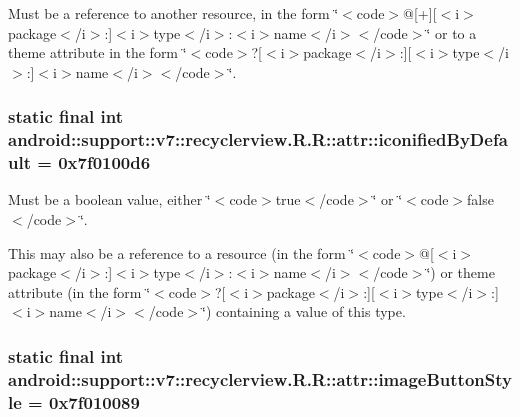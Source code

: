 Must be a reference to another resource, in the form \char`\"{}$<$code$>$@\mbox{[}+\mbox{]}\mbox{[}$<$i$>$package$<$/i$>$:\mbox{]}$<$i$>$type$<$/i$>$:$<$i$>$name$<$/i$>$$<$/code$>$\char`\"{} or to a theme attribute in the form \char`\"{}$<$code$>$?\mbox{[}$<$i$>$package$<$/i$>$:\mbox{]}\mbox{[}$<$i$>$type$<$/i$>$:\mbox{]}$<$i$>$name$<$/i$>$$<$/code$>$\char`\"{}. \hypertarget{classandroid_1_1support_1_1v7_1_1recyclerview_1_1_r_1_1attr_455008e854cc92bf685b28d87db05008}{
\subsubsection[{iconifiedByDefault}]{\setlength{\rightskip}{0pt plus 5cm}static final int android::support::v7::recyclerview.R.R::attr::iconifiedByDefault = 0x7f0100d6}}
\label{classandroid_1_1support_1_1v7_1_1recyclerview_1_1_r_1_1attr_455008e854cc92bf685b28d87db05008}


Must be a boolean value, either \char`\"{}$<$code$>$true$<$/code$>$\char`\"{} or \char`\"{}$<$code$>$false$<$/code$>$\char`\"{}. 

This may also be a reference to a resource (in the form \char`\"{}$<$code$>$@\mbox{[}$<$i$>$package$<$/i$>$:\mbox{]}$<$i$>$type$<$/i$>$:$<$i$>$name$<$/i$>$$<$/code$>$\char`\"{}) or theme attribute (in the form \char`\"{}$<$code$>$?\mbox{[}$<$i$>$package$<$/i$>$:\mbox{]}\mbox{[}$<$i$>$type$<$/i$>$:\mbox{]}$<$i$>$name$<$/i$>$$<$/code$>$\char`\"{}) containing a value of this type. \hypertarget{classandroid_1_1support_1_1v7_1_1recyclerview_1_1_r_1_1attr_e1d2e56accb0c06ac0e707e8b9a6fb06}{
\subsubsection[{imageButtonStyle}]{\setlength{\rightskip}{0pt plus 5cm}static final int android::support::v7::recyclerview.R.R::attr::imageButtonStyle = 0x7f010089}}
\label{classandroid_1_1support_1_1v7_1_1recyclerview_1_1_r_1_1attr_e1d2e56accb0c06ac0e707e8b9a6fb06}


